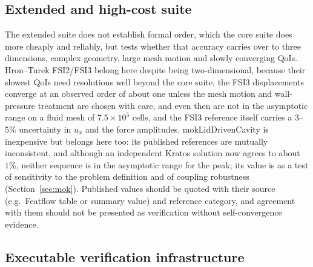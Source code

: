 \subsection{Extended and high-cost suite}\label{sec:extended_suite}

The extended suite does not establish formal order, which the core suite does more cheaply and reliably, but tests whether that accuracy carries over to three dimensions, complex geometry, large mesh motion and slowly converging QoIs.
Hron--Turek FSI2/FSI3 belong here despite being two-dimensional, because their slowest QoIs need resolutions well beyond the core suite, the FSI3 displacements converge at an observed order of about one unless the mesh motion and wall-pressure treatment are chosen with care, and even then are not in the asymptotic range on a fluid mesh of $7.5\times10^5$ cells, and the FSI3 reference itself carries a $3$--$5\%$ uncertainty in $u_x$ and the force amplitudes.
mokLidDrivenCavity is inexpensive but belongs here too: its published references are mutually inconsistent, and although an independent Kratos solution now agrees to about $1\%$, neither sequence is in the asymptotic range for the peak; its value is as a test of sensitivity to the problem definition and of coupling robustness (Section~\ref{sec:mok}).
Published values should be quoted with their source (e.g.\ Featflow table or summary value) and reference category, and agreement with them should not be presented as verification without self-convergence evidence.


\subsection{Executable verification infrastructure}\label{sec:infrastructure}

